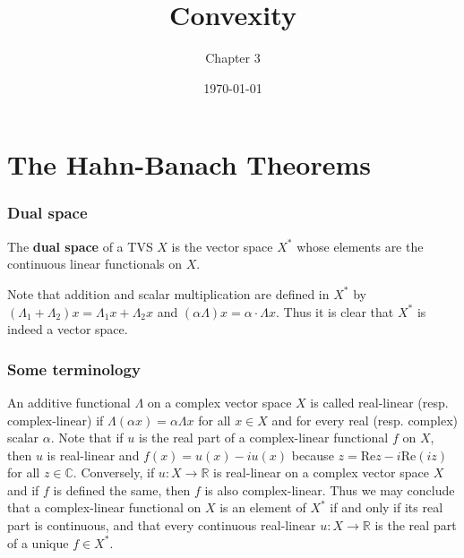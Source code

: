 \documentclass{beamer}
\title{Convexity}
\author{Chapter 3}
\institute{Functional Analysis}
\date{\today}
\begin{document}
\begin{frame}
\titlepage
\end{frame}
\section{The Hahn-Banach Theorems}
\begin{frame}
\frametitle{Dual space}
\begin{definition}
    The \textbf{dual space} of a TVS $X$ is the vector space $X^*$ whose elements are the continuous linear functionals on $X$.
\end{definition}
Note that addition and scalar multiplication are defined in $X^*$ by $(\Lambda_1 + \Lambda_2)x = \Lambda_1 x + \Lambda_2 x$ and $(\alpha\Lambda)x = \alpha \cdot \Lambda x$. Thus it is clear that $X^*$ is indeed a vector space.
\end{frame}
\begin{frame}
\frametitle{Some terminology}
An additive functional $\Lambda$ on a complex vector space $X$ is called real-linear (resp. complex-linear) if $\Lambda(\alpha x) = \alpha \Lambda x$ for all $x \in X$ and for every real (resp. complex) scalar $\alpha$. \newline\newline Note that if $u$ is the real part of a complex-linear functional $f$ on $X$, then $u$ is real-linear and $f(x) = u(x) - iu(x)$ because $z = \text{Re}z - i\text{Re}(iz)$ for all $z\in \mathbb{C}$. Conversely, if $u:X \to \mathbb{R}$ is real-linear on a complex vector space $X$ and if $f$ is defined the same, then $f$ is also complex-linear. \newline\newline Thus we may conclude that a complex-linear functional on $X$ is an element of $X^*$ if and only if its real part is continuous, and that every continuous real-linear $u:X \to \mathbb{R}$ is the real part of a unique $f\in X^*$.
\end{frame}
\end{document}
